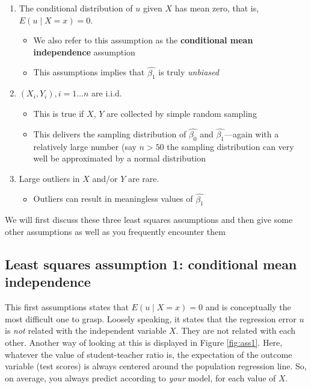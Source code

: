 \documentclass[
]{book}
\providecommand{\tightlist}{%
  \setlength{\itemsep}{0pt}\setlength{\parskip}{0pt}}
\begin{document}
\begin{enumerate}
\def\labelenumi{\arabic{enumi}.}
\tightlist
\item
  The conditional distribution of \(u\) given \(X\) has mean zero, that is, \(E(u \mid X = x) = 0\).

  \begin{itemize}
  \tightlist
  \item
    We also refer to this assumption as the \textbf{conditional mean independence} assumption
  \item
    This assumptions implies that \(\hat{\beta_1}\) is truly \emph{unbiased}
  \end{itemize}
\item
  \((X_i,Y_i), i =1 \ldots n\) are i.i.d.

  \begin{itemize}
  \tightlist
  \item
    This is true if \(X\), \(Y\) are collected by simple random sampling
  \item
    This delivers the sampling distribution of \(\hat{\beta_0}\) and \(\hat{\beta_1}\)---again with a relatively large number (say \(n > 50\) the sampling distribution can very well be approximated by a normal distribution
  \end{itemize}
\item
  Large outliers in \(X\) and/or \(Y\) are rare.

  \begin{itemize}
  \tightlist
  \item
    Outliers can result in meaningless values of \(\hat{\beta_1}\)
  \end{itemize}
\end{enumerate}

We will first discuss these three least squares assumptions and then give some other assumptions as well as you frequently encounter them

\hypertarget{least-squares-assumption-1-conditional-mean-independence}{%
\subsection{Least squares assumption 1: conditional mean independence}\label{least-squares-assumption-1-conditional-mean-independence}}

This first assumptions states that \(E(u \mid X = x) = 0\) and is conceptually the most difficult one to grasp. Loosely speaking, it states that the regression error \(u\) is \emph{not} related with the independent variable \(X\). They are not related with each other. Another way of looking at this is displayed in Figure \ref{fig:ass1}. Here, whatever the value of student-teacher ratio is, the expectation of the outcome variable (test scores) is always centered around the population regression line. So, on average, you always predict according to \emph{your} model, for each value of \(X\).
\end{document}

